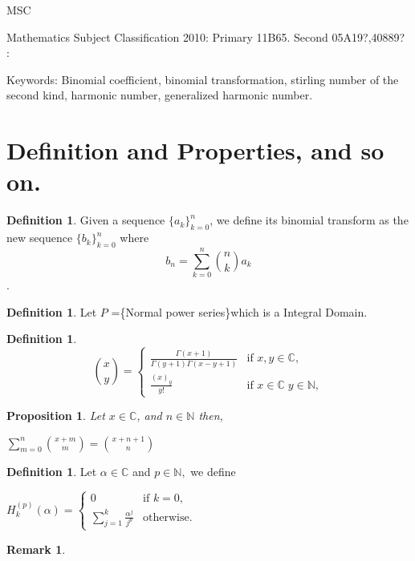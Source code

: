 \documentclass[a4paper,10pt,oneside]{article}
\newcommand{\BBN}{{\mathbb N}}
\newcommand{\BBC}{{\mathbb C}}
\newtheorem{remark}{Remark}[section]
\newtheorem{proposition}{Proposition}[section]
\theoremstyle{definition}
\newtheorem{definition}[theorem]{Definition}
\theoremstyle{remark}
\begin{document}
\vspace{25pt}\par
MSC{ Mathematics Subject Classification 2010: Primary 11B65. Second 05A19?,40889? : \par
 \vspace{25pt}
 Keywords: Binomial coefficient, binomial transformation, stirling number of the second kind,
harmonic number, generalized harmonic number.}

\newpage
{\section{Definition \bf{ and Properties}, and so on.}}
\begin{description}

\item \begin{definition} Given a sequence $\{a_k\}_{k=0}^n$, we define its binomial transform as the new sequence  $\{b_k\}_{k=0}^n$  where
$$ b_n= \sum_{k=0}^n\binom{n}{k}a_k  $$.
\end{definition}

\begin{definition} Let $P$ =\{Normal power series\}which is a Integral Domain.
\end{definition}

\begin{definition}
$$
\binom{x}{y} = 
\begin{cases}
\frac{\Gamma( x+1)}{\Gamma(y+1)\Gamma(x-y+1)} & \text{if  }  x,y\in \BBC, \\
\frac{(x)_y}{y!} & \text{if }  x\in\BBC\;y\in \BBN,
\end{cases}
$$
\end{definition}
\begin{proposition}\label{sum}
Let $x\in \BBC$, and $n\in \BBN$ then, \par
$\sum_{m=0}^n\binom{x+m}{m}=\binom{x+n+1}{n}$
\end{proposition}
 \begin{definition}
 Let $\alpha \in \BBC$ and $p \in \BBN,$ we define
\item $ H_k^{(p)}(\alpha)=\begin{cases}0&{\text{if }k=0},\\
  \sum_{j=1}^k\frac{\alpha^j}{j^p}&{\text{otherwise.}}\end{cases}$\par
 \end{definition}
 
 \begin{remark} 
 

\end{remark}
\end{description}
\end{document}
